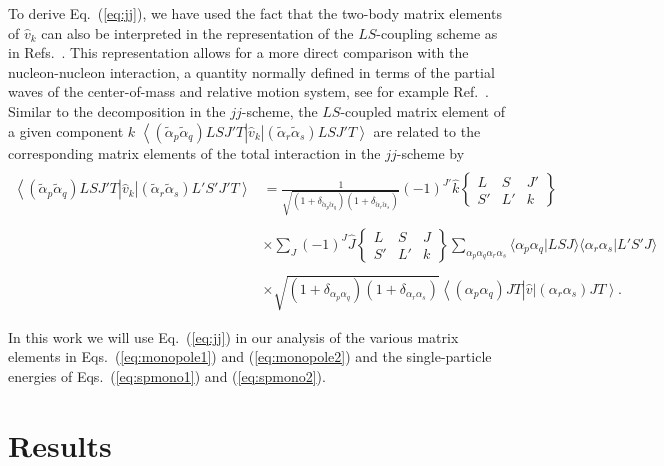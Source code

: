 \documentclass[preprint,12pt,authoryear]{elsarticle}
\newcommand{\bra}[1]{\left\langle #1 \right|}
\newcommand{\ket}[1]{\left| #1 \right\rangle}
\begin{document}
To derive Eq.~(\ref{eq:jj}), we have used the fact that the two-body
matrix elements of $\hat{v}_k$ can also be interpreted in the
representation of the $LS$-coupling scheme as in
Refs.~\cite{elliott1968,kirson1973,brown1988,osnes1992,richter1991,smirnova2010}. This
representation allows for a more direct comparison with the
nucleon-nucleon interaction, a quantity normally defined in terms of
the partial waves of the center-of-mass and relative motion system,
see for example Ref.~\cite{machleidt2011}.  Similar to the
decomposition in the $jj$-scheme, the $LS$-coupled matrix element of a
given component $k$ $\bra{(\tilde{\alpha}_p\tilde{\alpha}_q
  )LSJ'T}\hat{v}_{k}\ket{(\tilde{\alpha}_r\tilde{\alpha}_s )LSJ'T} $
are related to the corresponding matrix elements of the total
interaction in the $jj$-scheme by
\[
\begin{array}{ll}
&\\
\bra{(\tilde{\alpha}_p\tilde{\alpha}_q )LSJ'T}\hat{v}_{k}\ket{(\tilde{\alpha}_r\tilde{\alpha}_s )L'S'J'T}&=
{\displaystyle\frac{1}{\sqrt{(1+\delta_{\tilde{\alpha}_p\tilde{\alpha}_q})(1+\delta_{\tilde{\alpha}_r\tilde{\alpha}_s})}}}
(-1)^{J'}\hat{k}\left\{\begin{array}{ccc}L&S&J'\\S'&L'&k
\end{array}\right\}
\\&\\
&\times {\displaystyle\sum_{J}}(-1)^{J}\hat{J}\left\{\begin{array}{ccc}L&S&J\\S'&L'&k
\end{array}\right\}
{\displaystyle \sum_{\alpha_p \alpha_q \alpha_r \alpha_s}}
\langle \alpha_p\alpha_q|LSJ\rangle
\langle \alpha_r\alpha_s|L'S'J\rangle
\\&\\
&\times\sqrt{(1+\delta_{\alpha_p\alpha_q})(1+\delta_{\alpha_r\alpha_s})}\bra{(\alpha_p\alpha_q)JT}\hat{v}\ket{(\alpha_r\alpha_s)JT}
.\end{array}
\]

In this work we will use Eq.~(\ref{eq:jj}) in our analysis of the various matrix elements in Eqs.~(\ref{eq:monopole1}) 
and (\ref{eq:monopole2}) and the single-particle energies of Eqs.~(\ref{eq:spmono1})
and (\ref{eq:spmono2}).


\section{Results}\label{sec:results}
\end{document}
